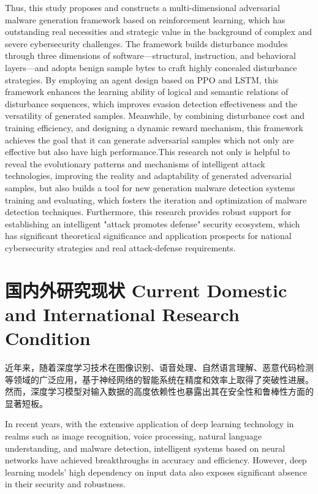 Thus, this study proposes and constructs a multi-dimensional adversarial malware generation framework based on reinforcement learning, which has outstanding real necessities and strategic value in the background of complex and severe cybersecurity challenges. The framework builds disturbance modules through three dimensions of software—structural, instruction, and behavioral layers—and adopts benign sample bytes to craft highly concealed disturbance strategies. By employing an agent design based on PPO and LSTM, this framework enhances the learning ability of logical and semantic relations of disturbance sequences, which improves evasion detection effectiveness and the versatility of generated samples. Meanwhile, by combining disturbance cost and training efficiency, and designing a dynamic reward mechanism, this framework achieves the goal that it can generate adversarial samples which not only are effective but also have high performance.This research not only is helpful to reveal the evolutionary patterns and mechanisms of intelligent attack technologies, improving the reality and adaptability of generated adversarial samples, but also builds a tool for new generation malware detection systems training and evaluating, which fosters the iteration and optimization of malware detection techniques. Furthermore, this research provides robust support for establishing an intelligent "attack promotes defense" security ecosystem, which has significant theoretical significance and application prospects for national cybersecurity strategies and real attack-defense requirements.

\section{国内外研究现状 Current Domestic and International Research Condition }
近年来，随着深度学习技术在图像识别、语音处理、自然语言理解、恶意代码检测等领域的广泛应用\cite{meng2022adavit,yang2022torchaudio,weld2022survey,lee2023classification}，基于神经网络的智能系统在精度和效率上取得了突破性进展。然而，深度学习模型对输入数据的高度依赖性也暴露出其在安全性和鲁棒性方面的显著短板。

In recent years, with the extensive application of deep learning technology in realms such as image recognition\cite{meng2022adavit,yang2022torchaudio,weld2022survey,lee2023classification}, voice processing, natural language understanding, and malware detection, intelligent systems based on neural networks have achieved breakthroughs in accuracy and efficiency. However, deep learning models’ high dependency on input data also exposes significant absence in their security and robustness.

